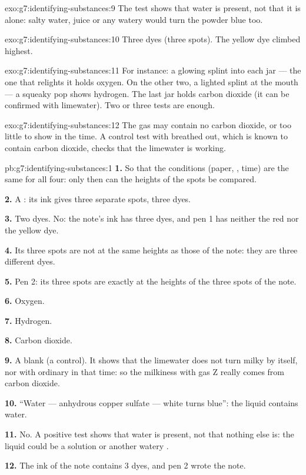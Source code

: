 \begin{solution}{exo:g7:identifying-substances:9}
The test shows that water is present, not that it is alone: salty water,
juice or any watery  would turn the powder blue too.
\end{solution}

\begin{solution}{exo:g7:identifying-substances:10}
Three dyes (three spots). The yellow dye climbed highest.
\end{solution}

\begin{solution}{exo:g7:identifying-substances:11}
For instance: a glowing splint into each jar --- the one that relights
it holds oxygen. On the other two, a lighted splint at the mouth --- a
squeaky pop shows hydrogen. The last jar holds carbon dioxide (it can be
confirmed with limewater). Two or three tests are enough.
\end{solution}

\begin{solution}{exo:g7:identifying-substances:12}
The gas may contain no carbon dioxide, or too little to show in the
time. A control test with  breathed out, which is known to contain carbon
dioxide, checks that the limewater is working.
\end{solution}

\begin{solution}{pb:g7:identifying-substances:1}
\textbf{1.} So that the conditions (paper, , time) are the same
for all four: only then can the heights of the spots be compared.

\textbf{2.} A : its ink gives three separate spots, three dyes.

\textbf{3.} Two dyes. No: the note's ink has three dyes, and pen 1 has
neither the red nor the yellow dye.

\textbf{4.} Its three spots are not at the same heights as those of the
note: they are three different dyes.

\textbf{5.} Pen 2: its three spots are exactly at the heights of the
three spots of the note.

\textbf{6.} Oxygen.

\textbf{7.} Hydrogen.

\textbf{8.} Carbon dioxide.

\textbf{9.} A blank (a control). It shows that the limewater does not
turn milky by itself, nor with ordinary  in that time: so the
milkiness with gas Z really comes from carbon dioxide.

\textbf{10.} ``Water --- anhydrous copper sulfate --- white turns blue'':
the liquid contains water.

\textbf{11.} No. A positive test shows that water is present, not that
nothing else is: the liquid could be a solution or another watery
.

\textbf{12.} The ink of the note contains 3 dyes, and pen 2 wrote the
note.
\end{solution}
